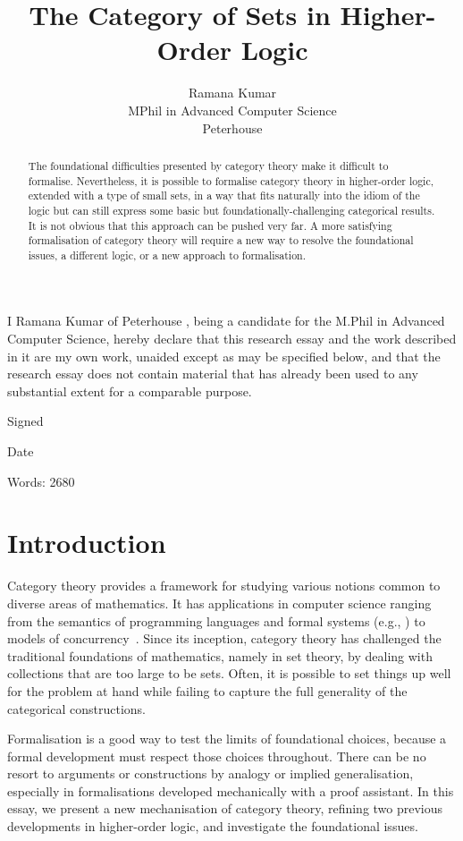 \documentclass[twoside,titlepage,11pt]{article}
\title{The Category of Sets in Higher-Order Logic}
\author{Ramana Kumar\\MPhil in Advanced Computer Science\\Peterhouse}
\begin{document}
\maketitle
\thispagestyle{empty}
I Ramana Kumar of Peterhouse , being a candidate for the M.Phil in Advanced Computer Science, hereby declare that this research essay and the work described in it are my own work, unaided except as may be specified below, and that the research essay does not contain material that has already been used to any substantial extent for a comparable purpose.

\vspace{1em}
\noindent Signed

\vspace{1em}
\noindent Date

\vspace{2em}
\noindent Words: 2680
\begin{abstract}%
The foundational difficulties presented by category theory make it difficult to formalise.
Nevertheless, it is possible to formalise category theory in higher-order logic, extended with a type of small sets, in a way that fits naturally into the idiom of the logic but can still express some basic but foundationally-challenging categorical results.
It is not obvious that this approach can be pushed very far.
A more satisfying formalisation of category theory will require a new way to resolve the foundational issues, a different logic, or a new approach to formalisation.
\end{abstract}%
\section{Introduction}%
Category theory provides a framework for studying various notions common to diverse areas of mathematics.
It has applications in computer science ranging from the semantics of programming languages and formal systems (e.g., \cite{CroleCT,JacobsCLTT}) to models of concurrency~\cite{DBLP:conf/csl/CattaniW96}.
Since its inception, category theory has challenged the traditional foundations of mathematics, namely in set theory, by dealing with collections that are too large to be sets. 
Often, it is possible to set things up well for the problem at hand while failing to capture the full generality of the categorical constructions.

Formalisation is a good way to test the limits of foundational choices, because a formal development must respect those choices throughout.
There can be no resort to arguments or constructions by analogy or implied generalisation, especially in formalisations developed mechanically with a proof assistant.
In this essay, we present a new mechanisation of category theory, refining two previous developments in higher-order logic, and investigate the foundational issues.
\end{document}

